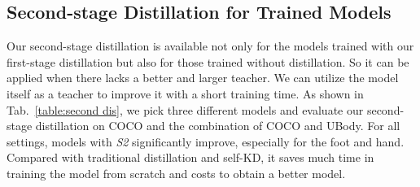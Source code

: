 \documentclass[10pt,twocolumn,letterpaper]{article}
\begin{document}
\begin{table}
  \centering
  \setlength{\tabcolsep}{12 pt}
  \vspace{0.1cm}
  \caption{Ablation study of the two distillation stages. The teacher and student are RTMPose-x and RTMPose-l. `*' denotes the model is trained on COCO + UBody.}
  \label{table:two dis}
  \vspace{-0.2cm}
\end{table}

\subsection{Second-stage Distillation for Trained Models}
Our second-stage distillation is available not only for the models trained with our first-stage distillation but also for those trained without distillation. So it can be applied when there lacks a better and larger teacher. We can utilize the model itself as a teacher to improve it with a short training time. As shown in Tab.~\ref{table:second dis}, we pick three different models and evaluate our second-stage distillation on COCO and the combination of COCO and UBody. For all settings, models with \emph{S2} significantly improve, especially for the foot and hand. Compared with traditional distillation and self-KD, it saves much time in training the model from scratch and costs to obtain a better model.
\end{document}

